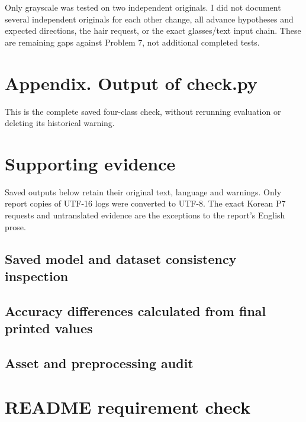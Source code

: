 \documentclass[11pt]{article}
\begin{document}
Only grayscale was tested on two independent originals. I did not document several independent originals for each other change, all advance hypotheses and expected directions, the hair request, or the exact glasses/text input chain. These are remaining gaps against Problem 7, not additional completed tests.

\clearpage
\section*{Appendix. Output of check.py}
This is the complete saved four-class check, without rerunning evaluation or deleting its historical warning.

\section*{Supporting evidence}
Saved outputs below retain their original text, language and warnings. Only report copies of UTF-16 logs were converted to UTF-8. The exact Korean P7 requests and untranslated evidence are the exceptions to the report's English prose.
\subsection*{Saved model and dataset consistency inspection}
\subsection*{Accuracy differences calculated from final printed values}
\subsection*{Asset and preprocessing audit}

\section*{README requirement check}

\end{document}
